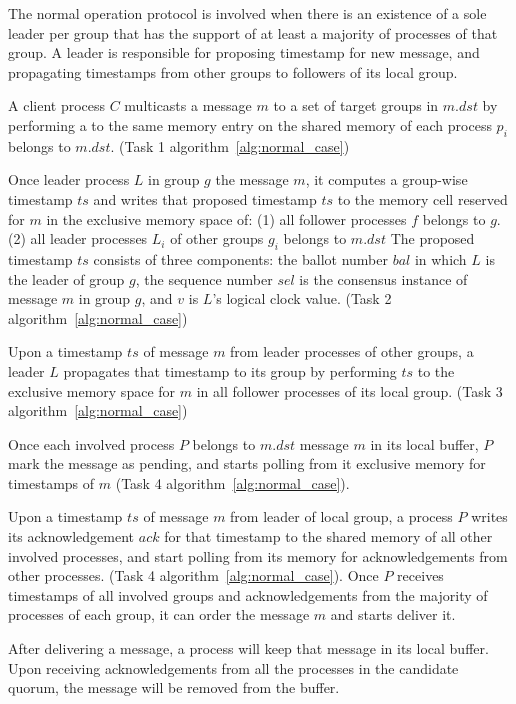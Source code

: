 The normal operation protocol is involved when there is an existence of a sole
leader per group that has the support of at least a majority of processes of
that group. A leader is responsible for proposing timestamp for new message, and
propagating timestamps from other groups to followers of its local group.

A client process $C$ multicasts a message $m$ to a set of target groups in
$m.dst$ by performing a \rwrite to the same memory entry on the shared memory of
each process $p_i$ belongs to $m.dst$. (Task 1 algorithm~\ref{alg:normal_case})

Once leader process $L$ in group $g$ \lread the message $m$, it computes a
group-wise timestamp $ts$ and writes that proposed timestamp $ts$ to the memory
cell reserved for $m$ in the exclusive memory space of: (1) all follower
processes $f$ belongs to $g$. (2) all leader processes $L_i$ of other groups
$g_i$ belongs to $m.dst$ The proposed timestamp $ts$ consists of three
components: the ballot number $bal$ in which $L$ is the leader of group $g$, the
sequence number $sel$ is the consensus instance of message $m$ in group $g$, and
$v$ is $L$'s logical clock value. (Task 2 algorithm~\ref{alg:normal_case})

Upon \lread a timestamp $ts$ of message $m$ from leader processes of other
groups, a leader $L$ propagates that timestamp to its group by performing
\rwrite $ts$ to the exclusive memory space for $m$ in all follower processes of
its local group. (Task 3 algorithm~\ref{alg:normal_case})

Once each involved process $P$ belongs to $m.dst$ \lread message $m$ in its
local buffer, $P$ mark the message as pending, and starts polling from it
exclusive memory for timestamps of $m$ (Task 4 algorithm~\ref{alg:normal_case}).

Upon \lread a timestamp $ts$ of message $m$ from leader of local group, a
process $P$ writes its acknowledgement $ack$ for that timestamp to the shared
memory of all other involved processes, and start polling from its memory for
acknowledgements from other processes. (Task 4 algorithm~\ref{alg:normal_case}).
Once $P$ receives timestamps of all involved groups and acknowledgements from
the majority of processes of each group, it can order the message $m$ and starts
deliver it.

After delivering a message, a process will keep that message in its local buffer.
Upon receiving acknowledgements from all the processes in the candidate
quorum, the message will be removed from the buffer.


